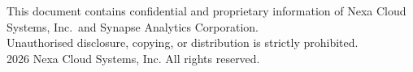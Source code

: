 \vspace{10pt}

\begin{center}
{\scriptsize\color{MidGrey}
  This document contains confidential and proprietary information of Nexa Cloud Systems,
  Inc.\ and Synapse Analytics Corporation.\\
  Unauthorised disclosure, copying, or distribution is strictly prohibited.\\[4pt]
  \textcopyright{} 2026 Nexa Cloud Systems, Inc. All rights reserved.
}
\end{center}
